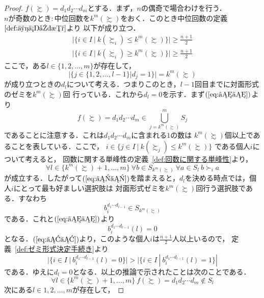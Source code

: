\documentclass[dvipdfmx]{jsarticle}
\begin{document}
\begin{proof}
  $f(\succsim) = d_{1}d_{2}\cdots d_{m}$とする．まず，$n$の偶奇で場合わけを行う．\\
  $n$が奇数のとき$\colon$中位回数を$k^m(\succsim)$をおく．このとき中位回数の定義~$\ref{def:中位回数}$より
  以下が成り立つ．
  \begin{gather}
    |\{ i \in I \ | \ k(\succsim_i) \leq k^{m}(\succsim) \}|  \geq \frac{n+1}{2} \label{eq:ああ}\\ 
    |\{ i \in I \ | \ k(\succsim_i) \geq k^{m}(\succsim) \}|  \geq \frac{n+1}{2} \label{eq:いい}
  \end{gather}
  ここで，ある$l \in \{1,2,\ldots,m\}$が存在して，
  \begin{equation}\label{eq:うう}
    |\{ j \in \{1,2,\ldots,l-1\} | d_j = 1 \}| = k^{m}(\succsim)
  \end{equation}
  が成り立つときの$d_l$について考える．つまりこのとき，$l-1$回目までに対面形式のゼミを$k^{m}(\succsim)$回
  行っている．これから$d_l=0$を示す．まず$(\ref{eq:うう})$より
  \begin{equation}\label{eq:かか}
    f(\succsim) = d_{1}d_{2}\cdots d_{m} \in \bigcup_{j=k^{m}(\succsim)}^{m}S_j
  \end{equation}
  であることに注意する．これは$d_{1}d_{2}\cdots d_{m}$に含まれる$1$の数は
  $k^{m}(\succsim)$個以上であることを表している．ここで，
  \mbox{$i \in \{j \in I \ | \ k(\succsim_j) \leq k^{m}(\succsim) \}$}
  である個人$i$について考えると，
  回数に関する単峰性の定義~\ref{def:回数に関する単峰性}より，
  \[
    \forall l \in \{k^m(\succsim)+1, \ldots, m\} \ \forall b \in S_{k^m(\succsim)}
    \ \forall a \in S_l \ b \succ_i a
  \]
  が成立する．したがって$(\ref{eq:かか})$を踏まえると，$d_l$を決める時点では，個人$i$にとって最も好ましい選択肢は
  対面形式ゼミを$k^m(\succsim)$回行う選択肢である．すなわち
  \[
    b_{i}^{d_{1}\cdots d_{l-1}} \in S_{k^m(\succsim)}
  \]
  である．これと$(\ref{eq:うう})$より
  \[
    b_{i}^{d_{1}\cdots d_{l-1}}(l) = 0
  \]
  となる．$(\ref{eq:ああ})$より，このような個人$i$は$\frac{n+1}{2}$人以上いるので，
  定義~\ref{def:ゼミ形式決定手続き}より
  \[
    |\{i \in I \ | \ b_{i}^{d_{1}\cdots d_{l-1}}(l) = 0 \}| >
    |\{i \in I \ | \ b_{i}^{d_{1}\cdots d_{l-1}}(l) = 1 \}|
  \]
  である．ゆえに$d_l=0$となる．以上の推論で示されたことは次のことである．
  \begin{equation}\label{eq:A}
    \forall l \in \{k^m(\succsim)+1, \ldots, m\} \ f(\succsim) = d_{1}d_{2}\cdots d_{m} \notin S_l
  \end{equation}
  次にある$l \in {1,2,\ldots,m}$が存在して，

\end{proof}
\end{document}
